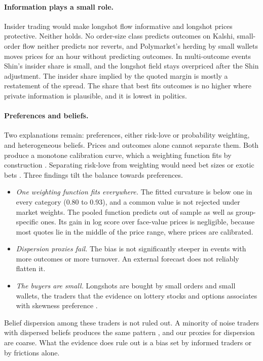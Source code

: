 \paragraph{Information plays a small role.} Insider trading would make longshot flow informative
and longshot prices protective. Neither holds. No order-size class predicts outcomes on Kalshi,
small-order flow neither predicts nor reverts, and Polymarket's herding by small wallets moves
prices for an hour without predicting outcomes. In multi-outcome events Shin's insider share is
small, and the longshot field stays overpriced after the Shin adjustment.
The insider share implied by the quoted margin is mostly a restatement of the spread. The share
that best fits outcomes is no higher where private information is plausible, and it is lowest in
politics.

\paragraph{Preferences and beliefs.} Two explanations remain: preferences, either risk-love or
probability weighting, and heterogeneous beliefs. Prices and outcomes alone cannot separate them.
Both produce a monotone calibration curve, which a weighting function fits by construction
\citep{manski2006,gandhi2015}. Separating risk-love from weighting would need bet sizes or exotic
bets \citep{snowbergwolfers2010}. Three findings tilt the balance towards preferences.
\begin{itemize}
  \item \emph{One weighting function fits everywhere.} The fitted curvature is below one in every
  category (0.80 to 0.93), and a common value is not rejected under market weights. The pooled
  function predicts out of sample as well as group-specific ones. Its gain in log score over
  face-value prices is negligible, because most quotes lie in the middle of the price range, where
  prices are calibrated.
  \item \emph{Dispersion proxies fail.} The bias is not significantly steeper in events with more
  outcomes or more turnover. An external forecast does not reliably flatten it.
  \item \emph{The buyers are small.} Longshots are bought by small orders and small wallets, the
  traders that the evidence on lottery stocks and options associates with skewness preference
  \citep{kumar2009,boyer2014,bryzgalova2023}.
\end{itemize}
Belief dispersion among these traders is not ruled out. A minority of noise traders with dispersed
beliefs produces the same pattern \citep{gandhi2015}, and our proxies for dispersion are coarse.
What the evidence does rule out is a bias set by informed traders or by frictions alone.

